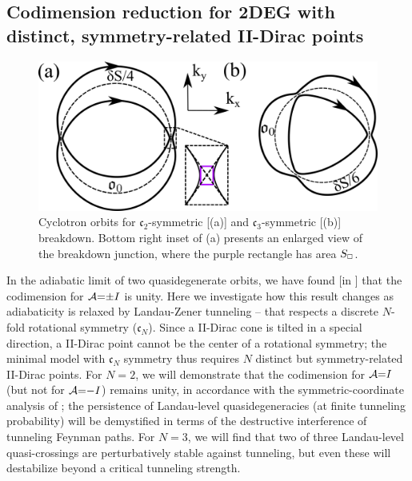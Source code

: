 \documentclass[aps, prb, showpacs, twocolumn, notitlepage, superscriptaddress]{revtex4-1}
\begin{document}
\subsection{Codimension reduction for 2DEG with distinct, symmetry-related II-Dirac points}\label{sec:rotsymmbreakdown}

\begin{figure}
\includegraphics[width=1.0\columnwidth]{Cn-breakdown.png}
\caption{Cyclotron orbits for $\mathfrak{c}_2$-symmetric [(a)] and $\mathfrak{c}_3$-symmetric [(b)] breakdown.  Bottom right inset of (a) presents an enlarged view of the breakdown junction, where the purple rectangle has area $S_{\scriptscriptstyle{\square}}$.\label{fig:Cn-breakdown}}
\end{figure}


In the adiabatic limit of two quasidegenerate orbits, we have found [in ] that the codimension for ${\cal A}{=}{\pm} I$ is unity. Here we investigate how this result changes as adiabaticity is relaxed by Landau-Zener tunneling -- that respects a discrete $N$-fold rotational symmetry ($\mathfrak{c}_N$). Since a II-Dirac cone is tilted in a special direction, a II-Dirac point cannot be the center of a rotational symmetry; the minimal model with $\mathfrak{c}_N$ symmetry thus requires $N$ distinct but symmetry-related II-Dirac points. For $N{=}2$, we will demonstrate that the codimension for ${\cal A}{=}I$ (but not for ${\cal A}{=}{-}I$) remains unity, in accordance with the symmetric-coordinate analysis of ; the persistence of  Landau-level quasidegeneracies  (at finite tunneling probability) will be demystified in terms of the destructive interference of tunneling Feynman paths. For $N{=}3$, we will find that two of three Landau-level quasi-crossings are perturbatively stable against tunneling, but even these will destabilize beyond a critical tunneling strength.


\end{document}

